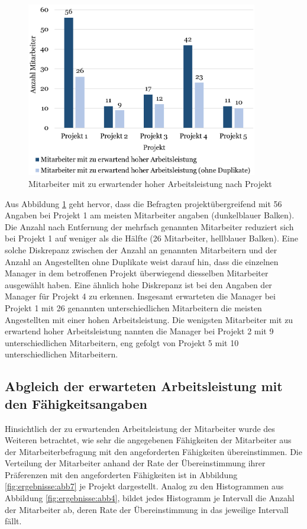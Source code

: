 \begin{figure}
    \centering
	\includegraphics[width=0.9\textwidth]{gfx/verteilung-m-prod.png}
	\caption[Mitarbeiter mit zu erwartender hoher Arbeitsleistung nach Projekt]{Mitarbeiter mit zu erwartender hoher Arbeitsleistung nach Projekt}
	\label{fig:ergebnisse:abb5}
\end{figure}

Aus Abbildung \ref{fig:ergebnisse:abb5} geht hervor, dass die Befragten projektübergreifend mit 56 Angaben bei Projekt 1 am meisten Mitarbeiter angaben (dunkelblauer Balken).
Die Anzahl nach Entfernung der mehrfach genannten Mitarbeiter reduziert sich bei Projekt 1 auf weniger als die Hälfte (26 Mitarbeiter, hellblauer Balken).
Eine solche Diskrepanz zwischen der Anzahl an genannten Mitarbeitern und der Anzahl an Angestellten ohne Duplikate weist darauf hin, dass die einzelnen Manager in dem betroffenen Projekt überwiegend diesselben Mitarbeiter ausgewählt haben.
Eine ähnlich hohe Diskrepanz ist bei den Angaben der Manager für Projekt 4 zu erkennen.
Insgesamt erwarteten die Manager bei Projekt 1 mit 26 genannten unterschiedlichen Mitarbeitern die meisten Angestellten mit einer hohen Arbeitsleistung.
Die wenigsten Mitarbeiter mit zu erwartend hoher Arbeitsleistung nannten die Manager bei Projekt 2 mit 9 unterschiedlichen Mitarbeitern, eng gefolgt von Projekt 5 mit 10 unterschiedlichen Mitarbeitern.

\subsection{Abgleich der erwarteten Arbeitsleistung mit den Fähigkeitsangaben}
Hinsichtlich der zu erwartenden Arbeitsleistung der Mitarbeiter wurde des Weiteren betrachtet, wie sehr die angegebenen Fähigkeiten der Mitarbeiter aus der Mitarbeiterbefragung mit den angeforderten Fähigkeiten übereinstimmen.
Die Verteilung der Mitarbeiter anhand der Rate der Übereinstimmung ihrer Präferenzen mit den angeforderten Fähigkeiten ist in Abbildung \ref{fig:ergebnisse:abb7} je Projekt dargestellt.
Analog zu den Histogrammen aus Abbildung \ref{fig:ergebnisse:abb4}, bildet jedes Histogramm je Intervall die Anzahl der Mitarbeiter ab, deren Rate der Übereinstimmung in das jeweilige Intervall fällt.

